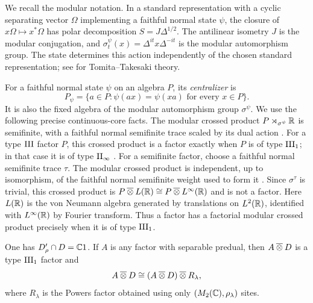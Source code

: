 We recall the modular notation. In a standard representation with a
cyclic separating vector $\Omega$ implementing a faithful normal state
$\psi$, the closure of $x\Omega\mapsto x^*\Omega$ has polar
decomposition $S=J\Delta^{1/2}$. The antilinear isometry $J$ is the
modular conjugation, and $\sigma_t^\psi(x)=\Delta^{it}x\Delta^{-it}$
is the modular automorphism group. The state determines this action
independently of the chosen standard representation; see
\cite{Takesaki2003II} for Tomita--Takesaki theory.

For a faithful normal state $\psi$ on an algebra $P$, its
\emph{centralizer} is
\[
 P_\psi=\{a\in P:\psi(ax)=\psi(xa)\text{ for every }x\in P\}.
\]
It is also the fixed algebra of the modular automorphism group
$\sigma^\psi$.  We use the following precise continuous-core facts.  The
modular crossed product $P\rtimes_{\sigma^\psi}\mathbb R$ is semifinite,
with a faithful normal semifinite trace scaled by its
dual action \cite[III.4.8.1--4, p.~329]{BlackadarOperatorAlgebras}.
For a type $\mathrm{III}$ factor $P$, this crossed product is a factor exactly
when $P$ is of type $\mathrm{III}_1$; in that case it is of type $\mathrm{II}_\infty$
\cite[Lemma~8.2 and Corollary~9.7]{Takesaki1973}.
For a semifinite factor, choose a faithful normal semifinite trace $\tau$.
The modular crossed product is independent, up to isomorphism, of the
faithful normal semifinite weight used to form it
\cite[III.4.8.1, p.~329]{BlackadarOperatorAlgebras}.
Since $\sigma^\tau$ is trivial, this crossed product is
$P\mathbin{\overline\otimes} L(\mathbb R)\cong P\mathbin{\overline\otimes} L^\infty(\mathbb R)$ and is not a factor.
Here $L(\mathbb R)$ is the von Neumann algebra generated by translations on
$L^2(\mathbb R)$, identified with $L^\infty(\mathbb R)$ by Fourier transform.
Thus a factor has a factorial modular crossed product precisely when
it is of type $\mathrm{III}_1$.

\begin{lemma}
\label{lem:fixed-tensor-factor}
One has $D_\rho'\cap D=\mathbb C1$.  If $A$ is any factor with separable predual,
then $A\mathbin{\overline\otimes} D$ is a type $\mathrm{III}_1$ factor and
\[
 A\mathbin{\overline\otimes} D\cong(A\mathbin{\overline\otimes} D)\mathbin{\overline\otimes} R_\lambda,
\]
where $R_\lambda$ is the Powers factor obtained using only
$(M_2(\mathbb C),\rho_\lambda)$ sites.
\end{lemma}

